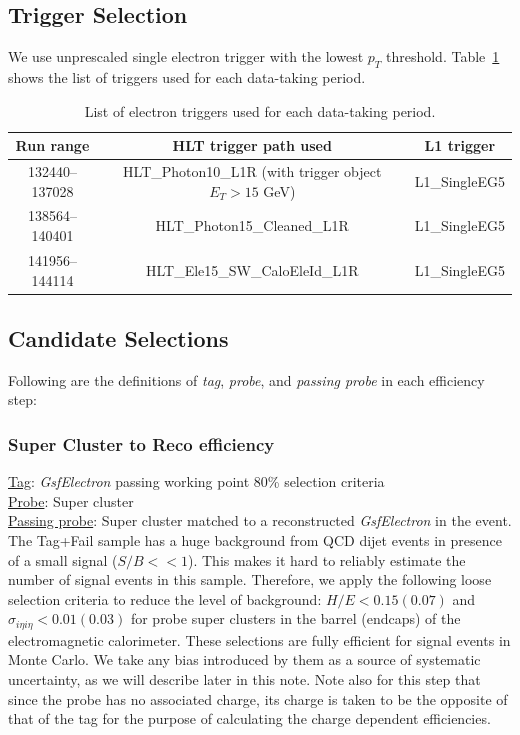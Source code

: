 \subsection{Trigger Selection}
We use unprescaled single electron trigger with the lowest $p_T$ threshold. 
Table~\ref{tab:TriggerTable} shows the list of triggers used for each 
data-taking period.
\begin{table}[!ht]
\begin{center}
\begin{tabular}{c|c|c} \hline \hline
Run range         &  HLT trigger path used      & L1 trigger\\ \hline
132440--137028    & HLT\_Photon10\_L1R (with trigger object $E_T>15$ GeV)   & L1\_SingleEG5      \\ \hline
138564--140401    & HLT\_Photon15\_Cleaned\_L1R    & L1\_SingleEG5      \\ \hline
141956--144114    & HLT\_Ele15\_SW\_CaloEleId\_L1R  & L1\_SingleEG5      \\ \hline
\end{tabular}
\caption{List of electron triggers used for each data-taking period. 
\label{tab:TriggerTable}}
\end{center}
\end{table}
\subsection{Candidate Selections}
Following are the definitions of \textit{tag}, \textit{probe}, and \textit{passing probe} in  
each efficiency step:
\subsubsection{Super Cluster to Reco efficiency}
\underline{Tag}: \textit{GsfElectron} passing working point 80\% selection criteria\\
\underline{Probe}: Super cluster \\
\underline{Passing probe}: Super cluster matched to a reconstructed \textit{GsfElectron} in the event.\\

The Tag+Fail sample has a huge background from QCD dijet events in presence of a 
small signal ($S/B << 1$). This makes it hard to reliably estimate the number of 
signal events in this sample. Therefore, we apply the following loose selection criteria 
to reduce the level of background: 
$H/E < 0.15 (0.07)$ and $\sigma_{i\eta i\eta} < 0.01 (0.03)$ 
for probe super clusters in the barrel (endcaps) of the electromagnetic calorimeter.
These selections are fully efficient for signal events in Monte Carlo. 
We take any bias introduced by them as a source of systematic uncertainty, as we will 
describe later in this note.  Note also for this step that since the probe has no associated 
charge, its charge is taken to be the opposite of that of the tag
for the purpose of calculating the charge dependent efficiencies.
